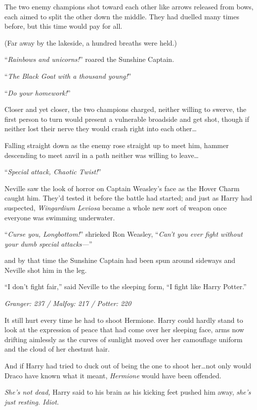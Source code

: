 The two enemy champions shot toward each other like arrows released from bows, each aimed to split the other down the middle. They had duelled many times before, but this time would pay for all.

(Far away by the lakeside, a hundred breaths were held.)

“\emph{Rainbows and unicorns!}” roared the Sunshine Captain.

“\emph{The Black Goat with a thousand young!}”

“\emph{Do your homework!}”

Closer and yet closer, the two champions charged, neither willing to swerve, the first person to turn would present a vulnerable broadside and get shot, though if neither lost their nerve they would crash right into each other…

Falling straight down as the enemy rose straight up to meet him, hammer descending to meet anvil in a path neither was willing to leave…

“\emph{Special attack, Chaotic Twist!}”

Neville saw the look of horror on Captain Weasley’s face as the Hover Charm caught him. They’d tested it before the battle had started; and just as Harry had suspected, \emph{Wingardium Leviosa} became a whole new sort of weapon once everyone was swimming underwater.

“\emph{Curse you, Longbottom!}” shrieked Ron Weasley, “\emph{Can’t you ever fight without your dumb special attacks—}”

and by that time the Sunshine Captain had been spun around sideways and Neville shot him in the leg.

“I don’t fight fair,” said Neville to the sleeping form, “I fight like Harry Potter.”

\later

\emph{Granger: 237 / Malfoy: 217 / Potter: 220}

It still hurt every time he had to shoot Hermione. Harry could hardly stand to look at the expression of peace that had come over her sleeping face, arms now drifting aimlessly as the curves of sunlight moved over her camouflage uniform and the cloud of her chestnut hair.

And if Harry had tried to duck out of being the one to shoot her…not only would Draco have known what it meant, \emph{Hermione} would have been offended.

\emph{She’s not dead,} Harry said to his brain as his kicking feet pushed him away, \emph{she’s just resting. \emph{Idiot.}}

